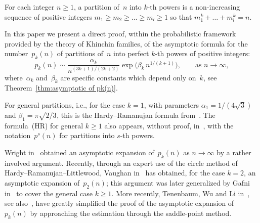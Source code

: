 \documentclass[12pt]{amsart}
\theoremstyle{definition}
\begin{document}
For each integer $n\ge 1$, a partition of~$n$ into $k$-th powers is a non-increasing sequence
of positive integers $m_1\ge m_2\ge\ldots\ge m_l\ge 1$ so that $m_1^k+\ldots+m_l^k=n$.
\smallskip

In this paper we present a direct proof, within the probabilistic framework provided
by the theory of Khinchin families, of the asymptotic formula for the number~$p_k(n)$ of
partitions of~$n$ into perfect $k$-th powers of positive integers:
\begin{equation}\tag{HR}
p_k(n) \sim \frac{\alpha_k}{n^{(3k+1)/(2k+2)}} \exp\!\Big(\beta_k\, n^{1/(k+1)}\Big), \qquad \text{as } n\to\infty,
\end{equation}
where~$\alpha_k$ and~$\beta_k$ are specific constants which depend only on~$k$, see Theorem~\ref{thm:asymptotic of pk(n)}.
\smallskip

For general partitions, i.e., for the case $k=1$, with parameters $\alpha_1=1/(4\sqrt{3})$ and
$\beta_1=\pi\sqrt{2/3}$, this is the Hardy--Ramanujan formula from~\cite{HardyRamanujan}. The formula~(HR) for general
$k\ge 1$ also appears, without proof, in~\cite[page~111]{HardyRamanujan}, with the notation~$p^s(n)$ for partitions
into $s$-th powers.
\smallskip

Wright in~\cite{Wright} obtained an asymptotic expansion of~$p_k(n)$ as $n\to\infty$ by a rather involved argument. Recently, through an expert use of the circle method of Hardy--Ramanujan--Littlewood, Vaughan in~\cite{Vaughan} has obtained, for the case $k=2$, an asymptotic
expansion of~$p_2(n)$; this argument was later generalized by Gafni in~\cite{Gafni} to cover the
general case $k\ge 1$. More recently, Tenenbaum, Wu and Li in~\cite{TWL}, see also~\cite{TWLarxiv}, have
greatly simplified the proof of the asymptotic expansion of~$p_k(n)$ by approaching the
estimation through the saddle-point method.
\smallskip
\end{document}
